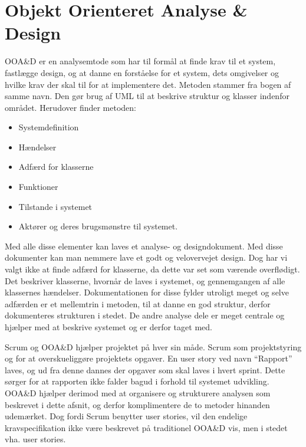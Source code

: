 \section{Objekt Orienteret Analyse \& Design}

OOA\&D er en analysemtode som har til formål at finde krav til et system, fastlægge design, og at danne en forståelse for et system, dets omgivelser og hvilke krav der skal til for at implementere det.
Metoden stammer fra bogen af samme navn.\citep{OOA&D2001}
Den gør brug af UML til at beskrive struktur og klasser indenfor området.
Herudover finder metoden:

\begin{itemize}
\item Systemdefinition
\item Hændelser
\item Adfærd for klasserne
\item Funktioner
\item Tilstande i systemet
\item Aktører og deres brugsmønstre til systemet.
\end{itemize}

Med alle disse elementer kan laves et analyse- og designdokument.
Med disse dokumenter kan man nemmere lave et godt og velovervejet design.
Dog har vi valgt ikke at finde adfærd for klasserne, da dette var set som værende overflødigt.
Det beskriver klasserne, hvornår de laves i systemet, og gennemgangen af alle klassernes hændelser. 
Dokumentationen for disse fylder utroligt meget og selve adfærden er et mellemtrin i metoden, til at danne en god struktur, derfor dokumenteres strukturen i stedet.
De andre analyse dele er meget centrale og hjælper med at beskrive systemet og er derfor taget med. 

Scrum og OOA\&D hjælper projektet på hver sin måde.
Scrum som projektstyring og for at overskueliggøre projektets opgaver. 
En user story ved navn ``Rapport'' laves, og ud fra denne dannes der opgaver som skal laves i hvert sprint. 
Dette sørger for at rapporten ikke falder bagud i forhold til systemet udvikling.
OOA\&D hjælper derimod med at organisere og strukturere analysen som beskrevet i dette afsnit, og derfor komplimentere de to metoder hinanden udemærket.
Dog fordi Scrum benytter user stories, vil den endelige kravspecifikation ikke være beskrevet på traditionel OOA\&D vis, men i stedet vha. user stories.









